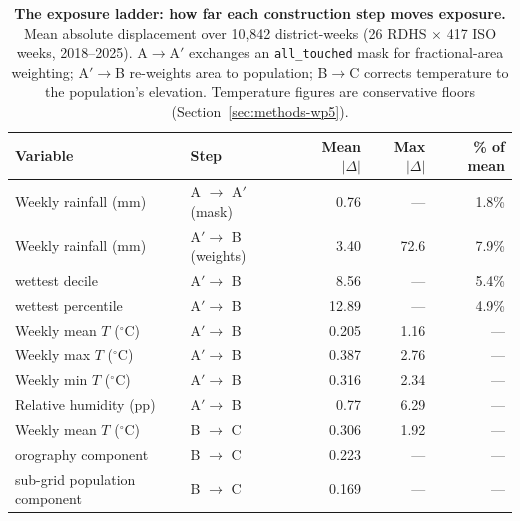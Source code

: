 \documentclass[11pt,a4paper]{article}
\begin{document}
\begin{table}[htbp]
\centering
\caption{\textbf{The exposure ladder: how far each construction step moves exposure.} Mean absolute displacement over 10{,}842 district-weeks (26 RDHS $\times$ 417 ISO weeks, 2018--2025). A$\to$A$'$ exchanges an \texttt{all\_touched} mask for fractional-area weighting; A$'\to$B re-weights area to population; B$\to$C corrects temperature to the population's elevation. Temperature figures are conservative floors (Section~\ref{sec:methods-wp5}).}
\label{tab:wp5-ladder}
{\footnotesize\begin{tabular}{@{}llrrr@{}}
\toprule
Variable & Step & Mean $|\Delta|$ & Max $|\Delta|$ & \% of mean \\
\midrule
Weekly rainfall (mm)      & A $\to$ A$'$ (mask)   & 0.76  & ---   & 1.8\% \\
Weekly rainfall (mm)      & A$'\to$ B (weights)   & 3.40  & 72.6  & 7.9\% \\
\quad wettest decile      & A$'\to$ B             & 8.56  & ---   & 5.4\% \\
\quad wettest percentile  & A$'\to$ B             & 12.89 & ---   & 4.9\% \\
Weekly mean $T$ ($^{\circ}$C)    & A$'\to$ B      & 0.205 & 1.16  & --- \\
Weekly max $T$ ($^{\circ}$C)     & A$'\to$ B      & 0.387 & 2.76  & --- \\
Weekly min $T$ ($^{\circ}$C)     & A$'\to$ B      & 0.316 & 2.34  & --- \\
Relative humidity (pp)           & A$'\to$ B      & 0.77  & 6.29  & --- \\
Weekly mean $T$ ($^{\circ}$C)    & B $\to$ C      & 0.306 & 1.92  & --- \\
\quad orography component        & B $\to$ C      & 0.223 & ---   & --- \\
\quad sub-grid population component & B $\to$ C   & 0.169 & ---   & --- \\
\bottomrule
\end{tabular}}
\end{table}
\end{document}
